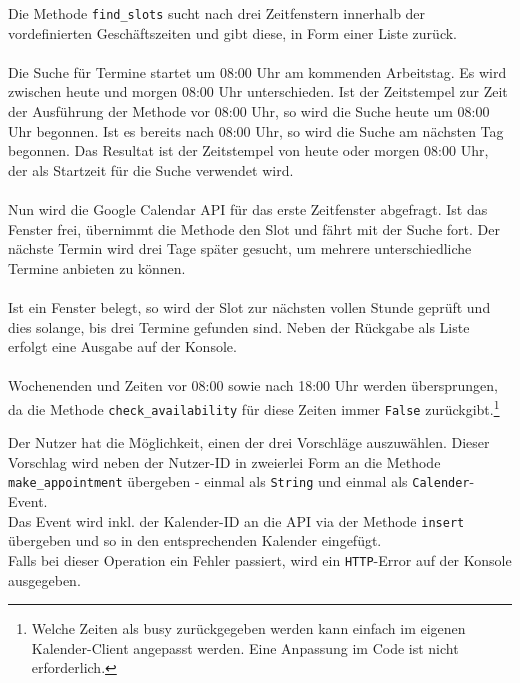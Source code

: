                 Die Methode \verb|find_slots| sucht nach drei Zeitfenstern innerhalb der vordefinierten Geschäftszeiten und gibt diese, in Form einer Liste zurück. \\
                \\
                Die Suche für Termine startet um 08:00 Uhr am kommenden Arbeitstag. Es wird zwischen heute und morgen 08:00 Uhr unterschieden. Ist der Zeitstempel zur Zeit der Ausführung der Methode vor 08:00 Uhr, so wird die Suche heute um 08:00 Uhr begonnen. Ist es bereits nach 08:00 Uhr, so wird die Suche am nächsten Tag begonnen. Das Resultat ist der Zeitstempel von heute oder morgen 08:00 Uhr, der als Startzeit für die Suche verwendet wird. \\
                \\
                Nun wird die Google Calendar API für das erste Zeitfenster abgefragt. Ist das Fenster frei, übernimmt die Methode den Slot und fährt mit der Suche fort. Der nächste Termin wird drei Tage später gesucht, um mehrere unterschiedliche Termine anbieten zu können. \\
                \\
                Ist ein Fenster belegt, so wird der Slot zur nächsten vollen Stunde geprüft und dies solange, bis drei Termine gefunden sind. Neben der Rückgabe als Liste erfolgt eine Ausgabe auf der Konsole.\\
                \\
                Wochenenden und Zeiten vor 08:00 sowie nach 18:00 Uhr werden übersprungen, da die Methode \verb|check_availability| für diese Zeiten immer \verb|False| zurückgibt.\footnote{Welche Zeiten als busy zurückgegeben werden kann einfach im eigenen Kalender-Client angepasst werden. Eine Anpassung im Code ist nicht erforderlich.}


                Der Nutzer hat die Möglichkeit, einen der drei Vorschläge auszuwählen. Dieser Vorschlag wird neben der Nutzer-ID in zweierlei Form an die Methode \\\verb|make_appointment| übergeben - einmal als \verb|String| und einmal als \verb|Calender|-Event. \\
                Das Event wird inkl. der Kalender-ID an die API via der Methode \verb|insert| übergeben und so in den entsprechenden Kalender eingefügt. \\
                Falls bei dieser Operation ein Fehler passiert, wird ein \verb|HTTP|-Error auf der Konsole ausgegeben.

